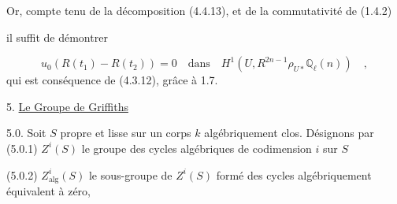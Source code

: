 Or, compte tenu de la décomposition (4.4.13), et de la commutativité de (1.4.2)

\begin{center}
\end{center}
il suffit de démontrer

\begin{equation*}
u_0(R(t_1) - R(t_2)) = 0 \quad \text{dans} \quad H^1(U,R^{2n-1}\rho_{U*}\mathbb{Q}_\ell(n)) \quad ,
\end{equation*}
qui est conséquence de (4.3.12), grâce à 1.7.


5.  \underline{Le Groupe de Griffiths}

5.0.  Soit  $S$  propre et lisse sur un corps  $k$  algébriquement clos. Désignons par
(5.0.1)   $Z^i(S)$  le groupe des cycles algébriques de codimension $i$  sur $S$

(5.0.2)   $Z^i_{\mathrm{alg}}(S)$ le sous-groupe de  $Z^i(S)$  formé des cycles algébriquement équivalent à zéro,

